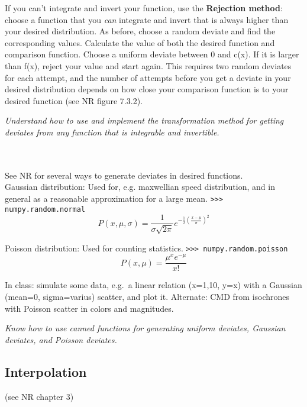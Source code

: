 \documentclass[12pt]{article}
\begin{document}
If you can't integrate and invert your function, use the \textbf{Rejection
method}: choose a function that you \emph{can} integrate and invert that is
always higher than your desired distribution. As before, choose a random deviate
and find the corresponding values. Calculate the value of both
the desired function and comparison function. Choose a uniform deviate between
0 and c(x). If it is larger than f(x), reject your value and start again.
This requires two random deviates for each attempt, and the number of attempts
before you get a deviate in your desired distribution depends on how close your
comparison function is to your desired function (see NR figure 7.3.2). \\

\colorbox{hl}{\parbox{0.9\textwidth}
{\emph{Understand how to use and implement the transformation method for
getting deviates from any function that is integrable and invertible.}}}
\\\\ See NR for several ways to generate deviates in desired functions. \\

Gaussian distribution:
Used for, e.g. maxwellian speed distribution, and in general as a
reasonable approximation for a large mean.
\texttt{>>> numpy.random.normal}
\begin{equation*}
    P(x,\mu,\sigma) = \frac{1}{\sigma\sqrt{2\pi}}
    e^{-\frac{1}{2}(\frac{x-\mu}{\sigma})^2   }
\end{equation*}

Poisson distribution:
Used for counting statistics.
\texttt{>>> numpy.random.poisson}
\begin{equation*}
    P(x,\mu) = \frac{\mu^xe^{-\mu}}{x!}
\end{equation*}

In class: simulate some data, e.g.\ a linear relation (x=1,10, y=x) with a
Gaussian (mean=0, sigma=varius) scatter, and plot it. Alternate: CMD from
isochrones with Poisson scatter in colors and magnitudes. \\

\colorbox{hl}{\parbox{0.9\textwidth}
{\emph{Know how to use canned functions for generating uniform deviates,
Gaussian deviates, and Poisson deviates.}}}

\subsection{Interpolation}
(see NR chapter 3)
\end{document}
